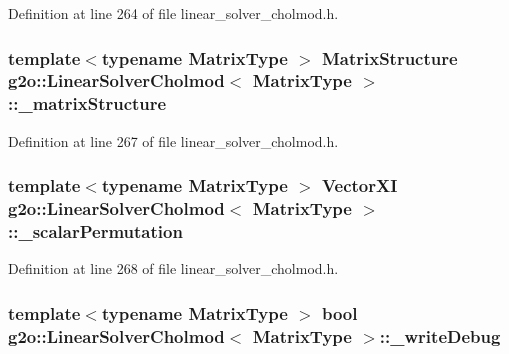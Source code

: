 Definition at line 264 of file linear\+\_\+solver\+\_\+cholmod.\+h.

\subsubsection[{\texorpdfstring{\+\_\+matrix\+Structure}{_matrixStructure}}]{\setlength{\rightskip}{0pt plus 5cm}template$<$typename Matrix\+Type $>$ {\bf Matrix\+Structure} {\bf g2o\+::\+Linear\+Solver\+Cholmod}$<$ Matrix\+Type $>$\+::\+\_\+matrix\+Structure\hspace{0.3cm}{\ttfamily [protected]}}\hypertarget{classg2o_1_1LinearSolverCholmod_af939e0478ab4fddb708729a8ab3b6560}{}\label{classg2o_1_1LinearSolverCholmod_af939e0478ab4fddb708729a8ab3b6560}


Definition at line 267 of file linear\+\_\+solver\+\_\+cholmod.\+h.

\subsubsection[{\texorpdfstring{\+\_\+scalar\+Permutation}{_scalarPermutation}}]{\setlength{\rightskip}{0pt plus 5cm}template$<$typename Matrix\+Type $>$ {\bf Vector\+XI} {\bf g2o\+::\+Linear\+Solver\+Cholmod}$<$ Matrix\+Type $>$\+::\+\_\+scalar\+Permutation\hspace{0.3cm}{\ttfamily [protected]}}\hypertarget{classg2o_1_1LinearSolverCholmod_aa195d0f2a09641240e8ab7da8b516460}{}\label{classg2o_1_1LinearSolverCholmod_aa195d0f2a09641240e8ab7da8b516460}


Definition at line 268 of file linear\+\_\+solver\+\_\+cholmod.\+h.

\subsubsection[{\texorpdfstring{\+\_\+write\+Debug}{_writeDebug}}]{\setlength{\rightskip}{0pt plus 5cm}template$<$typename Matrix\+Type $>$ bool {\bf g2o\+::\+Linear\+Solver\+Cholmod}$<$ Matrix\+Type $>$\+::\+\_\+write\+Debug\hspace{0.3cm}{\ttfamily [protected]}}\hypertarget{classg2o_1_1LinearSolverCholmod_ab13b752d37f43b2d8e1e4b2c7002b054}{}\label{classg2o_1_1LinearSolverCholmod_ab13b752d37f43b2d8e1e4b2c7002b054}


